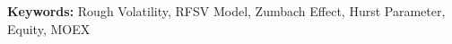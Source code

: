 


    \begin{titlepage}
        \maketitle

        \begin{abstract}
            
        \end{abstract}

        \noindent
        \textbf{Keywords: } Rough Volatility, RFSV Model, Zumbach Effect, Hurst Parameter, Equity, MOEX
        \thispagestyle{empty}
    \end{titlepage}

    \tableofcontents
    \thispagestyle{empty}
    \clearpage

    
    \clearpage

    
    \clearpage

    
    \clearpage

    
    \clearpage

    
    \clearpage

    \printbibliography
